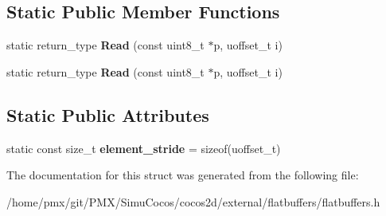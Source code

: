 \subsection*{Static Public Member Functions}
\begin{DoxyCompactItemize}
\item 
\mbox{\label{structflatbuffers_1_1IndirectHelper_3_01Offset_3_01T_01_4_01_4_a1d9e2e9f072cb81e208b8c915312b13f}} 
static return\+\_\+type {\bfseries Read} (const uint8\+\_\+t $\ast$p, uoffset\+\_\+t i)
\item 
\mbox{\label{structflatbuffers_1_1IndirectHelper_3_01Offset_3_01T_01_4_01_4_a1d9e2e9f072cb81e208b8c915312b13f}} 
static return\+\_\+type {\bfseries Read} (const uint8\+\_\+t $\ast$p, uoffset\+\_\+t i)
\end{DoxyCompactItemize}
\subsection*{Static Public Attributes}
\begin{DoxyCompactItemize}
\item 
\mbox{\label{structflatbuffers_1_1IndirectHelper_3_01Offset_3_01T_01_4_01_4_a78da19e7e99c1d2198b0bcb225647d24}} 
static const size\+\_\+t {\bfseries element\+\_\+stride} = sizeof(uoffset\+\_\+t)
\end{DoxyCompactItemize}


The documentation for this struct was generated from the following file\+:\begin{DoxyCompactItemize}
\item 
/home/pmx/git/\+P\+M\+X/\+Simu\+Cocos/cocos2d/external/flatbuffers/flatbuffers.\+h\end{DoxyCompactItemize}
